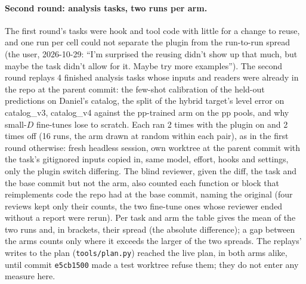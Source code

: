 \documentclass[11pt]{article}
\newcommand{\code}[1]{\texttt{#1}}
\begin{document}
\paragraph{Second round: analysis tasks, two runs per arm.} The first round's tasks were hook and tool code with little
for a change to reuse, and one run per cell could not separate the plugin from the run-to-run spread (the user,
2026-10-29: ``I'm surprised the reusing didn't show up that much, but maybe the task didn't allow for it. Maybe try more
examples''). The second round replays 4 finished analysis tasks whose inputs and readers were already in the repo at
the parent commit: the few-shot calibration of the held-out predictions on Daniel's catalog, the split of the hybrid
target's level error on catalog\_v3, catalog\_v4 against the pp-trained arm on the pp pools, and why small-$D$
fine-tunes lose to scratch. Each ran 2 times with the plugin on and 2 times off (16 runs, the arm drawn at random within
each pair), as in the first round otherwise: fresh headless session, own worktree at the parent commit with the task's
gitignored inputs copied in, same model, effort, hooks and settings, only the plugin switch differing. The blind
reviewer, given the diff, the task and the base commit but not the arm, also counted each function or block that
reimplements code the repo had at the base commit, naming the original (four reviews kept only their counts, the two
fine-tune ones whose reviewer ended without a report were rerun). Per task and arm the table gives the mean of the two
runs and, in brackets, their spread (the absolute difference); a gap between the arms counts only where it exceeds the
larger of the two spreads. The replays' writes to the plan (\code{tools/plan.py}) reached the live plan, in both arms
alike, until commit \code{e5cb1500} made a test worktree refuse them; they do not enter any measure here.
\end{document}
